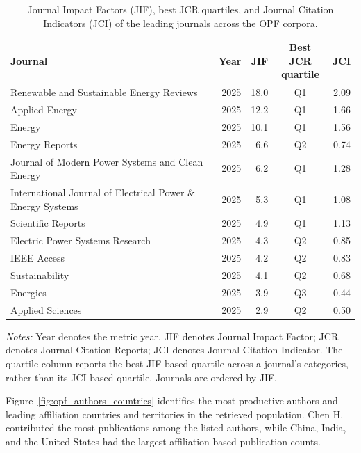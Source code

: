 \documentclass[a4paper,fleqn]{cas-sc}
\begin{document}
\begin{table}[htbp]
\centering
\caption{Journal Impact Factors (JIF), best JCR quartiles, and Journal Citation Indicators (JCI) of the leading journals across the OPF corpora.}
\label{tab:opf_journal_jcr_metrics}
\scriptsize
\setlength{\tabcolsep}{4pt}
\renewcommand{\arraystretch}{1.15}
\begin{tabularx}{\textwidth}{Xrrcr}
\toprule
Journal & Year & JIF & \shortstack{Best JCR\\quartile} & JCI \\
\midrule
Renewable and Sustainable Energy Reviews & 2025 & 18.0 & Q1 & 2.09 \\
Applied Energy & 2025 & 12.2 & Q1 & 1.66 \\
Energy & 2025 & 10.1 & Q1 & 1.56 \\
Energy Reports & 2025 & 6.6 & Q2 & 0.74 \\
Journal of Modern Power Systems and Clean Energy & 2025 & 6.2 & Q1 & 1.28 \\
International Journal of Electrical Power \& Energy Systems & 2025 & 5.3 & Q1 & 1.08 \\
Scientific Reports & 2025 & 4.9 & Q1 & 1.13 \\
Electric Power Systems Research & 2025 & 4.3 & Q2 & 0.85 \\
IEEE Access & 2025 & 4.2 & Q2 & 0.83 \\
Sustainability & 2025 & 4.1 & Q2 & 0.68 \\
Energies & 2025 & 3.9 & Q3 & 0.44 \\
Applied Sciences & 2025 & 2.9 & Q2 & 0.50 \\
\bottomrule
\end{tabularx}
\vspace{2mm}
\begin{minipage}{\textwidth}
\footnotesize
\textit{Notes:} Year denotes the metric year. JIF denotes Journal Impact Factor; JCR denotes Journal Citation Reports; JCI denotes Journal Citation Indicator. The quartile column reports the best JIF-based quartile across a journal's categories, rather than its JCI-based quartile. Journals are ordered by JIF.
\end{minipage}
\end{table}

Figure~\ref{fig:opf_authors_countries} identifies the most productive authors and leading affiliation countries and territories in the retrieved population. Chen H. contributed the most publications among the listed authors, while China, India, and the United States had the largest affiliation-based publication counts.
\end{document}
